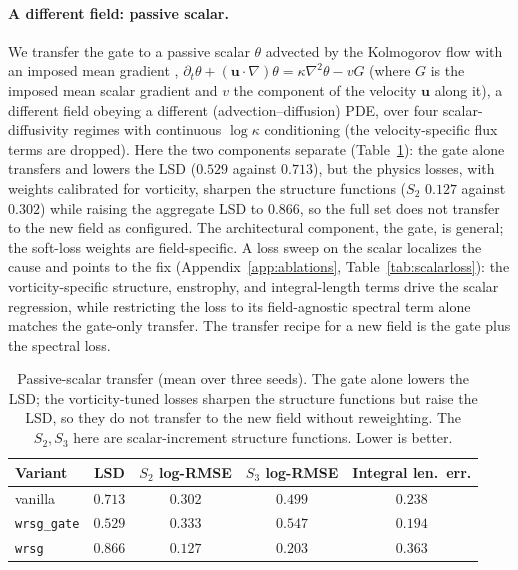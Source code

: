 \documentclass[10pt]{article} %
\begin{document}
\paragraph{A different field: passive scalar.} We transfer the gate to a passive scalar $\theta$ advected by the Kolmogorov flow with an imposed mean gradient \citep{warhaft2000passive}, $\partial_t\theta + (\mathbf{u}\cdot\nabla)\theta = \kappa\nabla^2\theta - vG$ (where $G$ is the imposed mean scalar gradient and $v$ the component of the velocity $\mathbf{u}$ along it), a different field obeying a different (advection--diffusion) PDE, over four scalar-diffusivity regimes with continuous $\log\kappa$ conditioning (the velocity-specific flux terms are dropped). Here the two components separate (Table~\ref{tab:scalar}): the gate alone transfers and lowers the LSD ($0.529$ against $0.713$), but the physics losses, with weights calibrated for vorticity, sharpen the structure functions ($S_2$ $0.127$ against $0.302$) while raising the aggregate LSD to $0.866$, so the full set does not transfer to the new field as configured. The architectural component, the gate, is general; the soft-loss weights are field-specific. A loss sweep on the scalar localizes the cause and points to the fix (Appendix~\ref{app:ablations}, Table~\ref{tab:scalarloss}): the vorticity-specific structure, enstrophy, and integral-length terms drive the scalar regression, while restricting the loss to its field-agnostic spectral term alone matches the gate-only transfer. The transfer recipe for a new field is the gate plus the spectral loss.

\begin{table}[H]
\centering
\caption{Passive-scalar transfer (mean over three seeds). The gate alone lowers the LSD; the vorticity-tuned losses sharpen the structure functions but raise the LSD, so they do not transfer to the new field without reweighting. The $S_2,S_3$ here are scalar-increment structure functions. Lower is better.}
\label{tab:scalar}
\begin{tabular}{lcccc}
\toprule
Variant & LSD & $S_2$ log-RMSE & $S_3$ log-RMSE & Integral len.\ err. \\
\midrule
vanilla            & $0.713$ & $0.302$ & $0.499$ & $0.238$ \\
\texttt{wrsg\_gate} & $\mathbf{0.529}$ & $0.333$ & $0.547$ & $\mathbf{0.194}$ \\
\texttt{wrsg}      & $0.866$ & $\mathbf{0.127}$ & $\mathbf{0.203}$ & $0.363$ \\
\bottomrule
\end{tabular}
\end{table}
\end{document}
